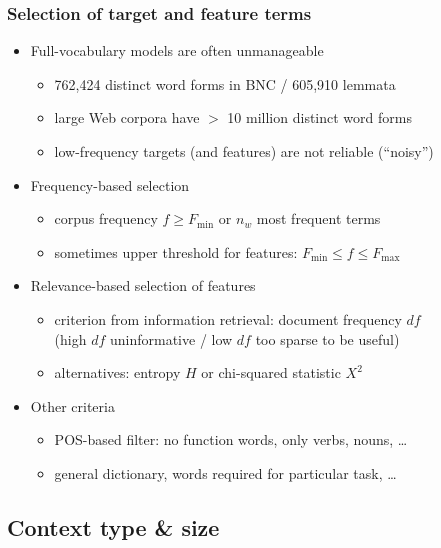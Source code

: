 \documentclass[t]{beamer} %
\begin{document}
\begin{frame}
  \frametitle{Selection of target and feature terms}
  
  \begin{itemize}
  \item Full-vocabulary models are often unmanageable
    \begin{itemize}
    \item 762,424 distinct word forms in BNC / 605,910 lemmata
    \item large Web corpora have $>$ 10 million distinct word forms
    \item low-frequency targets (and features) are not reliable (``noisy'')
    \end{itemize}
  \item<2-> Frequency-based selection
    \begin{itemize}
    \item corpus frequency $f \geq F_{\min}$ or $n_w$ most frequent terms
    \item sometimes upper threshold for features: $F_{\min}\leq f\leq F_{\max}$
    \end{itemize}
  \item<3-> Relevance-based selection of features
    \begin{itemize}
    \item criterion from information retrieval: document frequency $df$\\
      (high $df$ \so uninformative / low $df$ \so too sparse to be useful)
    \item alternatives: entropy $H$ or chi-squared statistic $X^2$
    \end{itemize}
  \item<4-> Other criteria
    \begin{itemize}
    \item POS-based filter: no function words, only verbs, nouns, \ldots
    \item general dictionary, words required for particular task, \ldots
    \end{itemize}
  \end{itemize}
\end{frame}

\subsection{Context type \& size}

\end{document}
